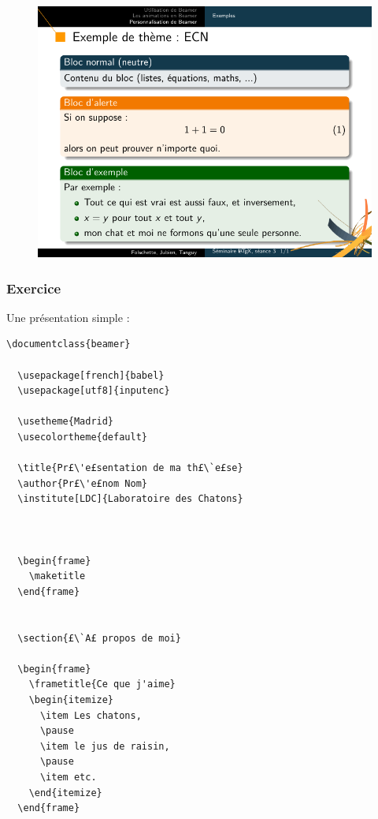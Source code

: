 \begin{frame}[plain]
\begin{figure}
  \centering
  \includegraphics[width=1\textwidth]{img/seance3_extheme_ecn}
\end{figure}
\end{frame}



\begin{frame}[fragile]
  \frametitle{Exercice}

Une présentation simple :

\begin{lstlisting}[multicols=2]
  \documentclass{beamer}

  \usepackage[french]{babel}
  \usepackage[utf8]{inputenc}

  \usetheme{Madrid}
  \usecolortheme{default}

  \title{Pr£\'e£sentation de ma th£\`e£se}
  \author{Pr£\'e£nom Nom}
  \institute[LDC]{Laboratoire des Chatons}

  

  \begin{frame}
    \maketitle
  \end{frame}

  
  \section{£\`A£ propos de moi}

  \begin{frame}
    \frametitle{Ce que j'aime}
    \begin{itemize}
      \item Les chatons,
      \pause
      \item le jus de raisin,
      \pause
      \item etc.
    \end{itemize}
  \end{frame}

  
\end{lstlisting}

\end{frame}


